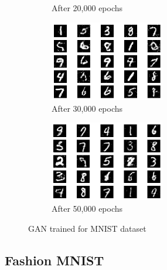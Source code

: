 \documentclass[a4paper]{article}    %
\begin{document}
\begin{figure}[H]
\begin{subfigure}{0.32\textwidth}
        \caption{After 20,000 epochs}
        \label{fig:mnist-epoch20000}
    \end{subfigure}
    \hfill
    \begin{subfigure}{0.32\textwidth}
        \centering
        \includegraphics[width=5cm]{30000}
        \caption{After 30,000 epochs}
        \label{fig:mnist-epoch30000}
    \end{subfigure}
    \hfill
    \begin{subfigure}{0.32\textwidth}
        \centering
        \includegraphics[width=5cm]{50000}
        \caption{After 50,000 epochs}
        \label{fig:mnist-epoch50000}
    \end{subfigure}
    \caption{GAN trained for MNIST dataset} 
    \label{fig:gan-mnist}
\end{figure}


\subsection{Fashion MNIST}

\graphicspath{{../figures/Q9/fashion_mnist/}}
\end{document}
